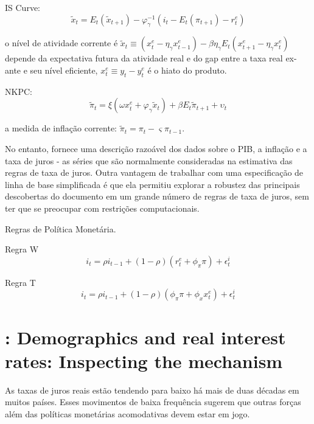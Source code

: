 \documentclass[11pt,oneside,a4paper]{article}
\begin{document}
IS Curve:
\begin{equation}
    \tilde{x}_t = E_t(\tilde{x}_{t+1}) - \varphi_{\gamma}^{-1}(i_t - E_t(\pi_{t+1}) - r_t^{e} )
\end{equation}

o nível de atividade corrente é $\tilde{x}_t \equiv (x_t^{e} - \eta_{\gamma}x_{t-1}^{e} ) - \beta \eta_{\gamma} E_t(x_{t+1}^{e} - \eta_{\gamma} x_t^{e} ) $ depende da expectativa futura da atividade real e do gap entre a taxa real ex-ante e seu nível eficiente, $x_t^{e} \equiv y_t - y_t^{e} $ é o hiato do produto.

NKPC:
\begin{equation}
    \tilde{\pi}_t = \xi(\omega x_t^{e} + \varphi_{\gamma}\tilde{x}_t ) + \beta E_t \tilde{\pi}_{t+1} + \upsilon_t
\end{equation}

a medida de inflação corrente: $\tilde{\pi}_t = \pi_t - \varsigma \pi_{t-1} $.

No entanto, fornece uma descrição razoável dos dados sobre o PIB, a inflação e a taxa de juros - as séries que são normalmente consideradas na estimativa das regras de taxa de juros. Outra vantagem de trabalhar com uma especificação de linha de base simplificada é que ela permitiu explorar a robustez das principais descobertas do documento em um grande número de regras de taxa de juros, sem ter que se preocupar com restrições computacionais.

Regras de Política Monetária.

Regra W
\begin{equation}
    i_t = \rho i_{t-1} + (1 - \rho)(r_t^{e} + \phi_{\pi} \pi) + \epsilon_t^{i}
\end{equation}

Regra T
\begin{equation}
    i_t = \rho i_{t-1} + (1 - \rho)(\phi_{\pi} \pi + \phi_x x_t^{e}) + \epsilon_t^{i}
\end{equation}
%
%
\section{\citet{Ferrero:2016}: Demographics and real interest rates: Inspecting the mechanism}

As taxas de juros reais estão tendendo para baixo há mais de duas décadas em muitos países. Esses movimentos de baixa frequência sugerem que outras forças além das políticas monetárias acomodativas devem estar em jogo.
\end{document}

